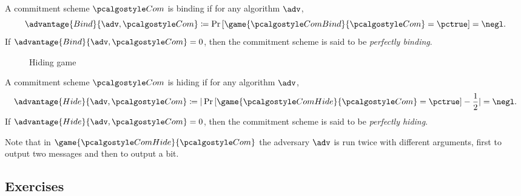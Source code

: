 \begin{definition}[Binding]
  A commitment scheme $\algo{Com}$ is binding if for any \ppt algorithm $\adv$,
 \[
  \advantage{Bind}{\adv, \algo{Com}} \defeq \pr{\game{\algo{ComBind}}{\algo{Com}} = \pctrue} = \negl.
 \]
 If $\advantage{Bind}{\adv, \algo{Com}} = 0$, then the commitment scheme is said to be \emph{perfectly binding}.
\end{definition}

\begin{figure}[tbhp]
  \begin{center}
    \begin{tcolorbox}[width=8cm]
      \begin{pchstack}[center]
      \end{pchstack}
    \end{tcolorbox}
  \end{center}
  \caption{Hiding game \label{fig:break-com-hid}}
\end{figure}

\begin{definition}[Hiding]
  A commitment scheme $\algo{Com}$ is hiding if for any \ppt algorithm $\adv$,
 \[
  \advantage{Hide}{\adv, \algo{Com}} \defeq |\pr{\game{\algo{ComHide}}{\algo{Com}} = \pctrue} - \frac{1}{2}| = \negl.
 \]
 If $\advantage{Hide}{\adv, \algo{Com}} = 0$, then the commitment scheme is said to be \emph{perfectly hiding}.
\end{definition}

Note that in $\game{\algo{ComHide}}{\algo{Com}}$ the adversary $\adv$ is run twice with different arguments, first to output two messages and then to output a bit.

\subsection{Exercises}

